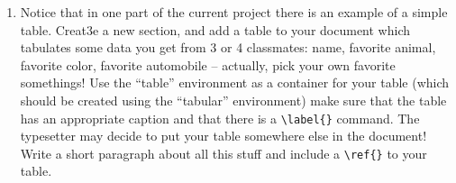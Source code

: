 \begin{enumerate}
\item Notice that in one part of the current project there is an example of a simple table.  Creat3e a new section, and add a table to your document which tabulates some data you get from 3 or 4 classmates:  name, favorite animal, favorite color, favorite automobile -- actually, pick your own favorite somethings!  Use the ``table'' environment as a container for your table (which should be created using the ``tabular'' environment)
make sure that the table has an appropriate caption and that there is a \verb+\label{}+ command.  The typesetter may decide to put your table somewhere else in the document!  Write a short paragraph about all this stuff and include a \verb+\ref{}+ to your table.

\end{enumerate}
